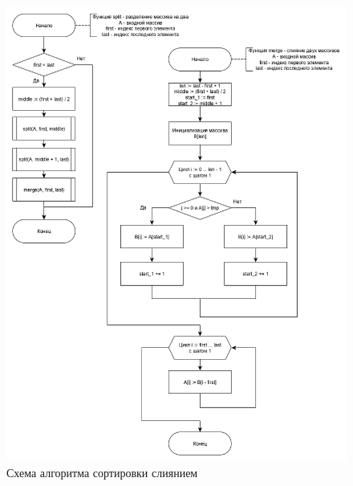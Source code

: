 \documentclass[12pt, a4paper]{report}
\begin{document}
	\newpage
	\begin{figure}[ht!]
		\centering
		\includegraphics[scale=0.55]{merge.png}
		\caption{Схема алгоритма сортировки слиянием}
		\label{pic:merge}
	\end{figure}
	\newpage
\end{document}
